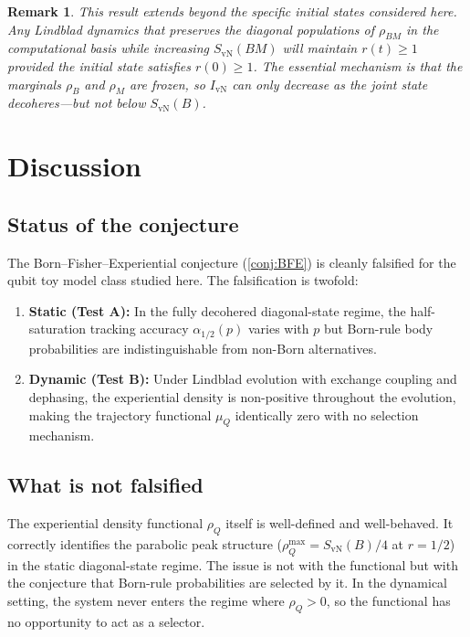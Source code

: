 \documentclass[12pt,a4paper]{article}
\newtheorem{remark}{Remark}
\newcommand{\SvN}{S_{\mathrm{vN}}}
\newcommand{\IvN}{I_{\mathrm{vN}}}
\newcommand{\rhoQ}{\rho_Q}
\newcommand{\muQ}{\mu_Q}
\begin{document}
\begin{remark}
This result extends beyond the specific initial states considered
here.  Any Lindblad dynamics that preserves the diagonal populations
of $\rho_{BM}$ in the computational basis while increasing
$\SvN(BM)$ will maintain $r(t) \ge 1$ provided the initial state
satisfies $r(0) \ge 1$.  The essential mechanism is that the
marginals $\rho_B$ and $\rho_M$ are frozen, so $\IvN$ can only
decrease as the joint state decoheres---but not below $\SvN(B)$.
\end{remark}

\section{Discussion}\label{sec:discussion}

\subsection{Status of the conjecture}

The Born--Fisher--Experiential conjecture
(\cref{conj:BFE}) is cleanly falsified for the qubit toy model
class studied here.  The falsification is twofold:
\begin{enumerate}
  \item \textbf{Static (Test A):} In the fully decohered diagonal-state
    regime, the half-saturation tracking accuracy $\alpha_{1/2}(p)$
    varies with $p$ but Born-rule body probabilities are
    indistinguishable from non-Born alternatives.
  \item \textbf{Dynamic (Test B):} Under Lindblad evolution with
    exchange coupling and dephasing, the experiential density is
    non-positive throughout the evolution, making the trajectory
    functional $\muQ$ identically zero with no selection mechanism.
\end{enumerate}

\subsection{What is not falsified}

The experiential density functional $\rhoQ$ itself is well-defined
and well-behaved.  It correctly identifies the parabolic peak
structure ($\rhoQ^{\max} = \SvN(B)/4$ at $r = 1/2$) in the static
diagonal-state regime.  The issue is not with the functional but
with the conjecture that Born-rule probabilities are selected by
it.  In the dynamical setting, the system never enters the regime
where $\rhoQ > 0$, so the functional has no opportunity to act as a
selector.
\end{document}
